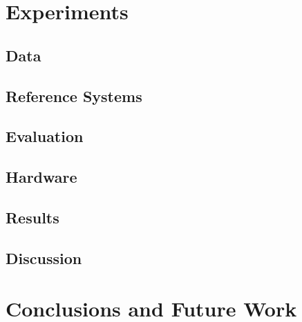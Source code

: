 \documentclass[11pt]{article}
\begin{document}
\section{Experiments}
\label{sec: experiments}

\subsection{Data}
\label{sec: data}

\subsection{Reference Systems}
\label{sec: reference systems}



\subsection{Evaluation}
\label{sec: evaluation}

\subsection{Hardware}
\label{sec: hardware}

\subsection{Results}
\label{sec: results}

\subsection{Discussion}
\label{sec: discussion}



\section{Conclusions and Future Work}
\label{sec: conclusions}





\newpage

%

\end{document}
